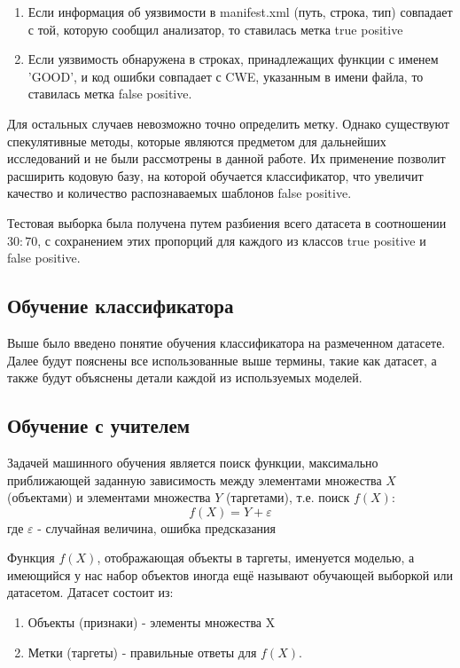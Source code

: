\begin{enumerate}
    \item Если информация об уязвимости в manifest.xml (путь, строка, тип) совпадает с той, которую сообщил анализатор, то ставилась метка true positive
    \item Если уязвимость обнаружена в строках, принадлежащих функции с именем 'GOOD', и код ошибки совпадает с CWE, указанным в имени файла, то ставилась метка false positive.
\end{enumerate}

Для остальных случаев невозможно точно определить метку. Однако существуют спекулятивные методы, которые являются предметом для дальнейших исследований и не были рассмотрены в данной работе. Их применение позволит расширить кодовую базу, на которой обучается классификатор, что увеличит качество и количество распознаваемых шаблонов false positive.

Тестовая выборка была получена путем разбиения всего датасета в соотношении $30:70$, с сохранением этих пропорций для каждого из классов true positive и false positive.

\subsection{Обучение классификатора}

Выше было введено понятие обучения классификатора на размеченном датасете. Далее будут пояснены все использованные выше термины, такие как датасет, а также будут объяснены детали каждой из используемых моделей.

\subsection{Обучение с учителем}

Задачей машинного обучения является поиск функции, максимально приближающей заданную зависимость между элементами множества $X$ (объектами) и элементами множества $Y$ (таргетами), т.е. поиск $f(X):$
\[f(X) = Y + \varepsilon\]
где $\varepsilon$ - случайная величина, ошибка предсказания

Функция $f(X)$, отображающая объекты в таргеты, именуется моделью, а имеющийся у нас набор объектов иногда ещё называют обучающей выборкой или датасетом. Датасет состоит из:

\begin{enumerate}
    \item Объекты (признаки) - элементы множества X
    \item Метки (таргеты) - правильные ответы для $f(X)$.
\end{enumerate}

